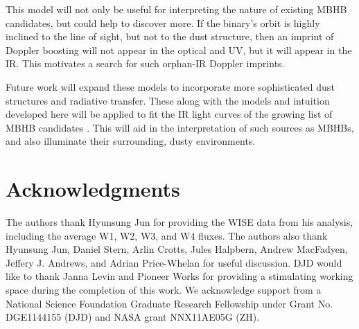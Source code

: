 

This model will not only be useful for interpreting the nature of existing
MBHB candidates, but could help to discover more. If the binary's orbit is
highly inclined to the line of sight, but not to the dust structure, then an
imprint of Doppler boosting will not appear in the optical and UV, but it will
appear in the IR. This motivates a search for such orphan-IR Doppler imprints.

Future work will expand these models to incorporate more sophisticated dust
structures and radiative transfer. These along with the models and intuition
developed here will be applied to fit the IR light curves of the growing list
of MBHB candidates \citep{Graham+2015b, Charisi+2016, Jun:2015}. This will aid
in the interpretation of such sources as MBHBs, and also illuminate their
surrounding, dusty environments.




\section*{Acknowledgments} 
The authors thank Hyunsung Jun for providing the WISE data from his analysis,
including the average W1, W2, W3, and W4 fluxes. The authors also thank Hyunsung
Jun, Daniel Stern, Arlin Crotts, Jules Halpbern, Andrew MacFadyen, Jeffery J.
Andrews, and Adrian Price-Whelan for useful
discussion. DJD would like to thank Janna Levin and Pioneer Works for
providing a stimulating working space during the completion of this work. We
acknowledge support from a National Science Foundation Graduate Research
Fellowship under Grant No. DGE1144155 (DJD) and NASA grant NNX11AE05G (ZH).










\renewcommand\thesection{\thechapter.\arabic{section}}